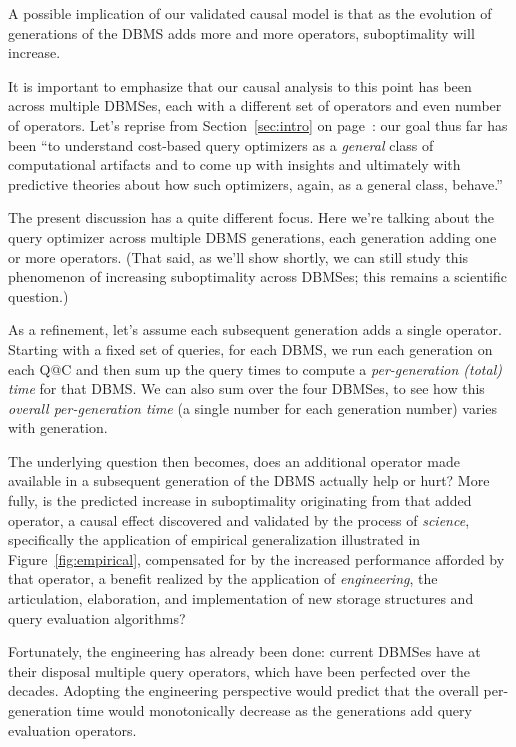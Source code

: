 \documentclass[prodmode,acmtods]{acmsmall}
\begin{document}
A possible implication of our validated causal model
is that as the evolution of generations of the \hbox{DBMS} adds more and more
operators, suboptimality will increase.

It is important to emphasize that our causal analysis to this point has been
across multiple \hbox{DBMSes}, each with a different set of
operators and even number of operators. Let's reprise from Section~\ref{sec:intro} on
page~\pageref{sec:intro}: our goal thus far has been ``to \hbox{understand}
cost-based query optimizers
as a {\em general} class of computational artifacts and to come up with
insights and ultimately with predictive theories about how such optimizers,
again, as a general class, behave.''

The present discussion has a quite different focus. Here we're talking about
the query optimizer across multiple DBMS
generations, each generation adding one or more operators. (That said, as
we'll show shortly, we can still study this phenomenon of increasing
suboptimality across DBMSes; this remains a scientific question.)

As a refinement, let's assume each subsequent
generation adds a single operator. Starting with a fixed set of queries,
for each DBMS, we run each generation on each Q@C and then sum up the query
times to compute a {\em per-generation (total) time} for that DBMS. We can
also sum over the four DBMSes, to see how this  {\em overall per-generation
  time} (a single number for each generation number) varies with generation.

The underlying question then becomes, does an additional operator made
available in a subsequent generation of the \hbox{DBMS} actually help or
hurt? More fully, is the predicted increase in suboptimality originating
from that added operator, a causal effect discovered and validated by the process
of {\em science}, specifically the application of \hbox{empirical} generalization illustrated
in Figure~\ref{fig:empirical}, compensated for by the increased performance
afforded by that operator, a benefit realized by the application of {\em
  engineering}, the articulation, elaboration, and implementation of new
storage structures and query evaluation algorithms?

Fortunately, the engineering has already been done: current DBMSes have at
their disposal multiple query operators, which have been perfected over the
decades. Adopting the engineering perspective would predict that the overall per-generation
time would monotonically decrease as the generations add query evaluation
operators.
\end{document}
